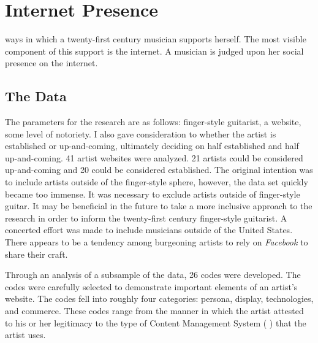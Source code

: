 \documentclass[nofonts,nobib]{tufte-handout}
\newcommand{\textls}[2][5]{%
    \begingroup\addfontfeatures{LetterSpace=#1}#2\endgroup
  }
\renewcommand{\smallcapsspacing}[1]{\textls[10]{#1}}
\renewcommand{\textsc}[1]{\smallcapsspacing{\textsmallcaps{#1}}}
\begin{document}
\section{Internet Presence}
\label{sec:internet-presence}
 ways in which a twenty-first century musician
supports herself. The most visible component of this support is the
internet. A musician is judged upon her social presence on the internet. 

\subsection{The Data}
\label{sec:data}
The parameters for the research are as follows: finger-style guitarist, a
website, some level of notoriety. I also gave consideration to whether the
artist is established or up-and-coming, ultimately deciding on half
established and half up-and-coming. 41 artist websites were analyzed. 21 artists could be considered up-and-coming and 20 could be
considered established. The original intention was to include artists outside of the finger-style
sphere, however, the data set quickly became too immense. It was necessary to
exclude artists outside of finger-style guitar. It may be beneficial in the
future to take a more inclusive approach to the research in order to inform
the twenty-first century finger-style guitarist. A concerted effort was
made to include musicians outside of the United States. There appears to be a
tendency among burgeoning artists to rely on \emph{Facebook} to share their
craft.

Through an analysis of a subsample of the data, 26 codes were developed. The
codes were carefully selected to demonstrate important elements of an artist's
website. The codes fell into roughly four categories: persona, display,
technologies, and commerce. These codes range from the manner in which the
artist attested to his or her legitimacy to the type of Content Management System (\textsc{cms}) that the artist uses.
\end{document}
